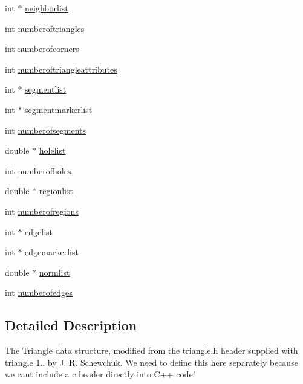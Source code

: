 \begin{DoxyCompactItemize}
\item 
int $\ast$ \hyperlink{structoomph_1_1TriangulateIO_a3f0a3004099431cc5f5a7293b24663d6}{neighborlist}
\item 
int \hyperlink{structoomph_1_1TriangulateIO_ab5df959c5a822eab8acedec2d806bae0}{numberoftriangles}
\item 
int \hyperlink{structoomph_1_1TriangulateIO_adc650f3a1adb293757fe9877c68bdc67}{numberofcorners}
\item 
int \hyperlink{structoomph_1_1TriangulateIO_a51314a924a2c9ddd3490853b81dc61a7}{numberoftriangleattributes}
\item 
int $\ast$ \hyperlink{structoomph_1_1TriangulateIO_ae462430ddb959339807abcee1b841e54}{segmentlist}
\item 
int $\ast$ \hyperlink{structoomph_1_1TriangulateIO_a575c4af48f801838fbed1cac09d9f744}{segmentmarkerlist}
\item 
int \hyperlink{structoomph_1_1TriangulateIO_a8344f9d855e55a6af46640818ba4886b}{numberofsegments}
\item 
double $\ast$ \hyperlink{structoomph_1_1TriangulateIO_ab6a245bf3c2ed27265e34770e3ac72b4}{holelist}
\item 
int \hyperlink{structoomph_1_1TriangulateIO_a3a79dd389487ce78445394dc8c042ad8}{numberofholes}
\item 
double $\ast$ \hyperlink{structoomph_1_1TriangulateIO_a758701efdcf2b22bfe6f0dd67c809beb}{regionlist}
\item 
int \hyperlink{structoomph_1_1TriangulateIO_a90d13cdb572f5d3cd51946cd10210b17}{numberofregions}
\item 
int $\ast$ \hyperlink{structoomph_1_1TriangulateIO_ad5f468b0711991370f24d47aea673b0b}{edgelist}
\item 
int $\ast$ \hyperlink{structoomph_1_1TriangulateIO_a5a2743276f51517729ed47f29722e061}{edgemarkerlist}
\item 
double $\ast$ \hyperlink{structoomph_1_1TriangulateIO_aaee7350c5c3ac8105643724ae5455823}{normlist}
\item 
int \hyperlink{structoomph_1_1TriangulateIO_ab444b409c5d6d1796e114e5846c7fc1b}{numberofedges}
\end{DoxyCompactItemize}


\subsection{Detailed Description}
The Triangle data structure, modified from the triangle.\+h header supplied with triangle 1.. by J. R. Schewchuk. We need to define this here separately because we can\textquotesingle{}t include a c header directly into C++ code! 

